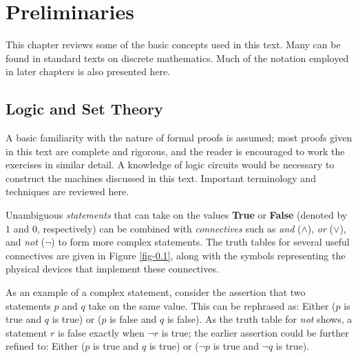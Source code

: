 \chapter{Preliminaries}\label{ch-0}

This chapter reviews some of the basic concepts used in this text. Many can be
found in standard texts on discrete mathematics. Much of the notation employed
in later chapters is also presented here.

\section{Logic and Set Theory}\label{sec-0.1}
A basic familiarity with the nature of formal proofs is assumed; most proofs
given in this text are complete and rigorous, and the reader is encouraged to
work the exercises in similar detail. A knowledge of logic circuits would be
necessary to construct the machines discussed in this text. Important
terminology and techniques are reviewed here.

Unambiguous \emph{statements} that can take on the values \textbf{True} or \textbf{False} 
(denoted by $1$ and $0$, respectively) can be combined with \emph{connectives} such as
\emph{and} ($\wedge$), \emph{or} ($\vee$), and \emph{not} ($\neg$)
to form more complex statements.
The truth tables for several useful connectives are given in Figure \ref{fig-0.1},
along with the symbols representing the physical devices that implement these
connectives.

As an example of a complex statement, consider the assertion that two statements
$p$ and $q$ take on the same value. This can be rephrased as:
Either ($p$ is true and $q$ is true) or ($p$ is false and $q$ is false).  As the
truth table for \emph{not} shows, a statement $r$ is false exactly when $\neg$$r$ is
true; the earlier assertion could be further refined to:
Either ($p$ is true and $q$ is true) or ($\neg p$ is true and $\neg q$ is true).

